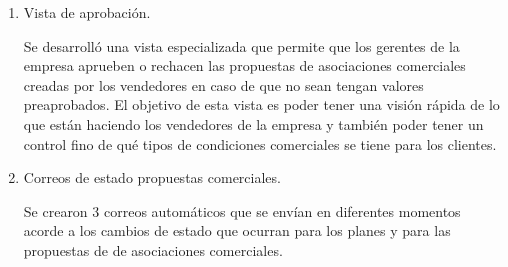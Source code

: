 \begin{enumerate}
    \item Vista de aprobación.
    
    Se desarrolló una vista especializada que permite que los gerentes de la empresa aprueben o rechacen las propuestas de asociaciones comerciales creadas por los vendedores en caso de que no sean tengan valores preaprobados. El objetivo de esta vista es poder tener una visión rápida de lo que están haciendo los vendedores de la empresa y también poder tener un control fino de qué tipos de condiciones comerciales se tiene para los clientes.
    
    \item Correos de estado propuestas comerciales.
    
    Se crearon 3 correos automáticos que se envían en diferentes momentos acorde a los cambios de estado que ocurran para los planes y para las propuestas de de asociaciones comerciales.

  \end{enumerate}
